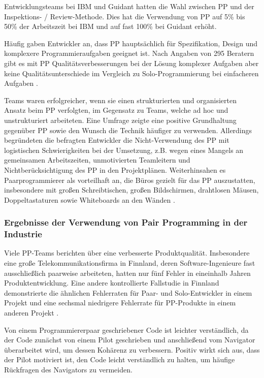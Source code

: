 Entwicklungsteams bei IBM und Guidant hatten die Wahl zwischen PP und der Inspektions- / Review-Methode. Dies hat die Verwendung von PP auf 5\% bis 50\% der Arbeitszeit bei IBM und auf fast 100\% bei Guidant erhöht.


Häufig gaben Entwickler an, dass PP hauptsächlich für Spezifikation, Design und komplexere Programmieraufgaben geeignet ist. Nach Angaben von 295 Beratern gibt es mit PP Qualitätsverbesserungen bei der Lösung komplexer Aufgaben aber keine Qualitätsunterschiede im Vergleich zu Solo-Programmierung bei einfacheren Aufgaben \cite{Williams2010PairProgramming}.


Teams waren erfolgreicher, wenn sie einen strukturierten und organisierten Ansatz beim PP verfolgten, im Gegensatz zu Teams, welche ad hoc und unstrukturiert arbeiteten. Eine Umfrage zeigte eine positive Grundhaltung gegenüber PP sowie den Wunsch die Technik häufiger zu verwenden. Allerdings begründeten die befragten Entwickler die Nicht-Verwendung des PP mit logistischen Schwierigkeiten bei der Umsetzung, z.B. wegen eines Mangels an gemeinsamen Arbeitszeiten, unmotivierten Teamleitern und Nichtberücksichtigung des PP in den Projektplänen. Weiterhinsahen es Paarprogrammierer als vorteilhaft an, die Büros gezielt für das PP auszustatten, insbesondere mit großen Schreibtischen, großen Bildschirmen, drahtlosen Mäusen, Doppeltastaturen sowie Whiteboards an den Wänden \cite{Williams2010PairProgramming}.



\subsubsection{ Ergebnisse der Verwendung von Pair Programming in der Industrie}



Viele PP-Teams berichten über eine verbesserte Produktqualität. Insbesondere eine große Telekommunikationsfirma in Finnland, deren Software-Ingenieure fast ausschließlich paarweise arbeiteten, hatten nur fünf Fehler in eineinhalb Jahren Produktentwicklung. Eine andere kontrollierte Fallstudie in Finnland demonstrierte die ähnlichen Fehlerraten für Paar- und Solo-Entwickler in einem Projekt und eine sechsmal niedrigere Fehlerrate für PP-Produkte in einem anderen Projekt \cite{Williams2010PairProgramming}.


Von einem Programmiererpaar geschriebener Code ist leichter verständlich, da der Code zunächst von einem Pilot geschrieben und anschließend vom Navigator überarbeitet wird, um dessen Kohärenz zu verbessern. Positiv wirkt sich aus, dass der Pilot motiviert ist, den Code leicht verständlich zu halten, um häufige Rückfragen des Navigators zu vermeiden.


